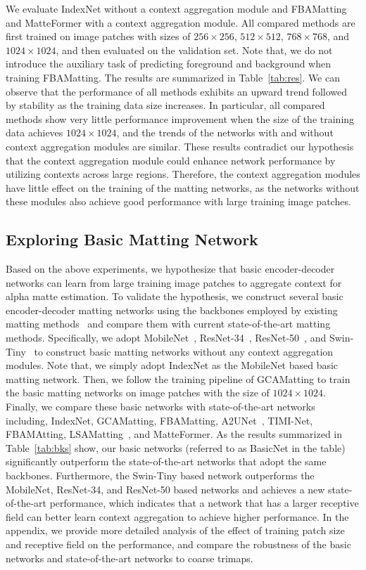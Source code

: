 \documentclass[10pt,twocolumn,letterpaper]{article}
\begin{document}
We evaluate IndexNet without a context aggregation module and FBAMatting and MatteFormer with a context aggregation module. 
All compared methods are first trained on image patches with sizes of $256 \times 256$, $512 \times 512$, $768 \times 768$, and $1024 \times 1024$, and then evaluated on the validation set. 
Note that, we do not introduce the auxiliary task of predicting foreground and background when training FBAMatting.
The results are summarized in Table~\ref{tab:res}. 
We can observe that the performance of all methods exhibits an upward trend followed by stability as the training data size increases. 
In particular, all compared methods show very little performance improvement when the size of the training data achieves $1024 \times 1024$, and the trends of the networks with and without context aggregation modules are similar. 
These results contradict our hypothesis that the context aggregation module could enhance network performance by utilizing contexts across large regions.
Therefore, the context aggregation modules have little effect on the training of the matting networks, as the networks without these modules also achieve good performance with large training image patches.


\subsection{Exploring Basic Matting Network}
\label{sec:33}
Based on the above experiments, we hypothesize that basic encoder-decoder networks can learn from large training image patches to aggregate context for alpha matte estimation. 
To validate the hypothesis, we construct several basic encoder-decoder matting networks using the backbones employed by existing matting methods~\cite{lu2019indices,li2020natural,dai2021learning,forte2020fbamatting,park2022matteformer} and compare them with current state-of-the-art matting methods. 
Specifically, we adopt MobileNet~\cite{sandler2018mobilenetv2}, ResNet-34~\cite{he2016deep}, ResNet-50~\cite{he2016deep}, and Swin-Tiny~\cite{liu2021Swin} to construct basic matting networks without any context aggregation modules.
Note that, we simply adopt IndexNet as the MobileNet based basic matting network.
Then, we follow the training pipeline of GCAMatting to train the basic matting networks on image patches with the size of $1024 \times 1024$.
Finally, we compare these basic networks with state-of-the-art networks including, IndexNet, GCAMatting, FBAMatting, A2UNet~\cite{dai2021learning}, TIMI-Net, FBAMAtting, LSAMatting~\cite{lsam}, and MatteFormer.
As the results summarized in Table~\ref{tab:bks} show, our basic networks (referred to as BasicNet in the table)  significantly outperform the state-of-the-art networks that adopt the same backbones. 
Furthermore, the Swin-Tiny based network outperforms the MobileNet, ResNet-34, and ResNet-50 based networks and achieves a new state-of-the-art performance, which indicates that a network that has a larger receptive field can better learn context aggregation to achieve higher performance.
In the appendix, we provide more detailed analysis of the effect of training patch size and receptive field on the performance, and compare the robustness of the basic networks and state-of-the-art networks to coarse trimaps.
\end{document}
